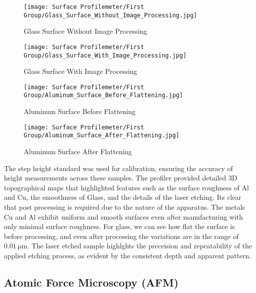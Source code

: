 \documentclass[11pt]{article}
\begin{document}
	\begin{figure}[htbp]
		\centering
		\texttt{[image: Surface Profilemeter/First Group/Glass\_Surface\_Without\_Image\_Processing.jpg]}
		\caption{Glass Surface Without Image Processing}
		\label{fig:OP_Glass_Surface_Without_Image_Processing}
	\end{figure}
	
	\begin{figure}[!ht]
		\centering
		\texttt{[image: Surface Profilemeter/First Group/Glass\_Surface\_With\_Image\_Processing.jpg]}
		\caption{Glass Surface With Image Processing}
		\label{fig:OP_Glass_Surface_With_Image_Processing}
	\end{figure}
	
	\begin{figure}[!ht]
		\centering
		\texttt{[image: Surface Profilemeter/First Group/Aluminum\_Surface\_Before\_Flattening.jpg]}
		\caption{Aluminum Surface Before Flattening}
		\label{fig:OP_Aluminum_Surface_Before_Flattening}
	\end{figure}
	
	\begin{figure}[!ht]
		\centering
		\texttt{[image: Surface Profilemeter/First Group/Aluminum\_Surface\_After\_Flattening.jpg]}
		\caption{Aluminum Surface After Flattening}
		\label{fig:OP_Aluminum_Surface_After_Flattening}
	\end{figure}
	
	The step height standard was used for calibration, ensuring the accuracy of height measurements across these samples. The profiler provided detailed 3D topographical maps that highlighted features such as the surface roughness of Al and Cu, the smoothness of Glass, and the details of the laser etching. Its clear that post processing is required due to the nature of the apparatus. The metals Cu and Al exhibit uniform and smooth surfaces even after manufacturing with only minimal surface roughness. For glass, we can see how flat the surface is before processing, and even after processing the variations are in the range of $\qty{0.01}{\micro\meter}$. The laser etched sample highlghts the preceision and repeatability of the applied etching process, as evident by the consistent depth and apparent pattern.
	
\clearpage

	\subsection{Atomic Force Microscopy (AFM)}
	
\end{document}
